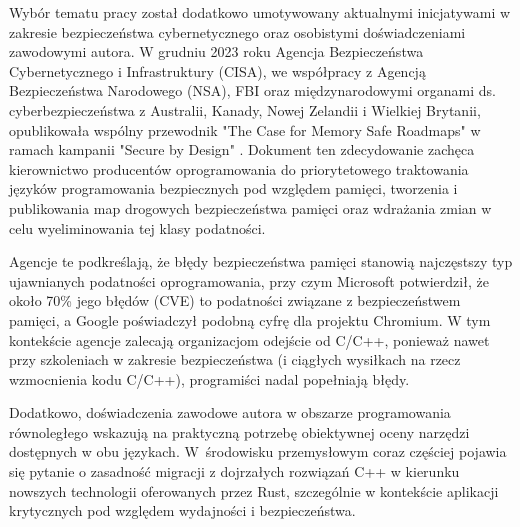 Wybór tematu pracy został dodatkowo umotywowany aktualnymi inicjatywami w zakresie bezpieczeństwa cybernetycznego oraz osobistymi doświadczeniami zawodowymi autora. W grudniu 2023 roku Agencja Bezpieczeństwa Cybernetycznego i Infrastruktury (CISA), we współpracy z Agencją Bezpieczeństwa Narodowego (NSA), FBI oraz międzynarodowymi organami ds. cyberbezpieczeństwa z Australii, Kanady, Nowej Zelandii i Wielkiej Brytanii, opublikowała wspólny przewodnik "The Case for Memory Safe Roadmaps" w ramach kampanii "Secure by Design" \cite{DoD2023MemorySafe}. Dokument ten zdecydowanie zachęca kierownictwo producentów oprogramowania do priorytetowego traktowania języków programowania bezpiecznych pod względem pamięci, tworzenia i publikowania map drogowych bezpieczeństwa pamięci oraz wdrażania zmian w celu wyeliminowania tej klasy podatności.

Agencje te podkreślają, że błędy bezpieczeństwa pamięci stanowią najczęstszy typ ujawnianych podatności oprogramowania, przy czym Microsoft potwierdził, że około 70\% jego błędów (CVE) to podatności związane z bezpieczeństwem pamięci, a Google poświadczył podobną cyfrę dla projektu Chromium. W tym kontekście agencje zalecają organizacjom odejście od C/C++, ponieważ nawet przy szkoleniach w zakresie bezpieczeństwa (i ciągłych wysiłkach na rzecz wzmocnienia kodu C/C++), programiści nadal popełniają błędy.

Dodatkowo, doświadczenia zawodowe autora w obszarze programowania równoległego wskazują na praktyczną potrzebę obiektywnej oceny narzędzi dostępnych w obu językach. W~środowisku przemysłowym coraz częściej pojawia się pytanie o zasadność migracji z dojrzałych rozwiązań C++ w kierunku nowszych technologii oferowanych przez Rust, szczególnie w kontekście aplikacji krytycznych pod względem wydajności i bezpieczeństwa.

